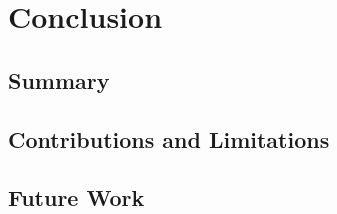 \documentclass[12pt,a4paper]{article}
\begin{document}
%
%
%
%
%
%
%
%
\newpage
\section{Conclusion} \label{section:conclusion}


\subsection{Summary} \label{subsection:summary}


\subsection{Contributions and Limitations} \label{subsection:contributionsandlimitations}


\subsection{Future Work} \label{subsection:futurework}





%
%
%
%
%
%
%
%
	
\end{document}
